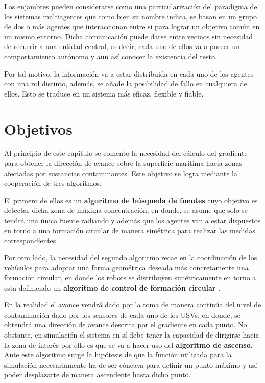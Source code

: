 Los enjambres pueden considerarse como una particularización del paradigma de los sistemas multiagentes que como bien su nombre indica, se basan en un grupo de dos o más agentes que interaccionan entre si para lograr un objetivo común en un mismo entorno. Dicha comunicación puede darse entre vecinos sin necesidad de recurrir a una entidad central, es decir, cada uno de ellos va a poseer un comportamiento autónomo y aun así conocer la existencia del resto.

Por tal motivo, la información va a estar distribuida en cada uno de los agentes con una rol distinto, además, se añade la posibilidad de fallo en cualquiera de ellos. Esto se traduce en un sistema más eficaz, flexible y fiable. 

\section{Objetivos} \label{Objetivos_Principales}

Al principio de este capitulo se comento la necesidad del cálculo del gradiente para obtener la dirección de avance sobre la superficie marítima hacia zonas afectadas por sustancias contaminantes. Este objetivo se logra mediante la cooperación de tres algoritmos.

El primero de ellos es un \textbf{algoritmo de búsqueda de fuentes} \cite{Estimacion_Gradiente} cuyo objetivo es detectar dicha zona de máxima concentración, en donde, se asume que solo se tendrá una única fuente radiando y además que los agentes van a estar dispuestos en torno a una formación circular de manera simétrica para realizar las medidas correspondientes. 

Por otro lado, la necesidad del segundo algoritmo recae en la coordinación de los vehículos para adoptar una forma geométrica deseada más concretamente una formación circular, en donde los robots se distribuyen simétricamente en torno a esta definiendo un \textbf{algoritmo de control de formación circular} \cite{Control_Formacion}.

En la realidad el avance vendrá dado por la toma de manera continúa del nivel de contaminación dado por los sensores de cada uno de los USVs, en donde, se obtendrá una dirección de avance descrita por el gradiente en cada punto. No obstante, en simulación el sistema en sí debe tener la capacidad de dirigirse hacia la zona de interés por ello es que se va a hacer uso del \textbf{algoritmo de ascenso}. Ante este algoritmo surge la hipótesis de que la función utilizada para la simulación necesariamente ha de ser cóncava para definir un punto máximo y así poder desplazarte de manera ascendente hasta dicho punto.\\


